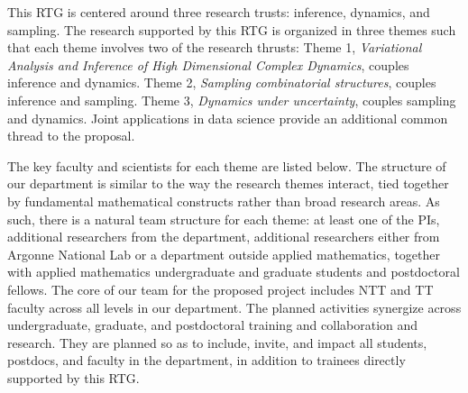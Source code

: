 \documentclass[11pt]{NSFamsart}
\begin{document}
This RTG is centered around three research trusts: inference, dynamics, and sampling. The research supported by this RTG is organized in three themes such that each theme involves two of the research thrusts: 
Theme 1, \emph{Variational Analysis and Inference of High Dimensional Complex Dynamics}, couples inference and dynamics. 
Theme 2, \emph{Sampling combinatorial structures}, couples inference and sampling. 
Theme 3, \emph{Dynamics under uncertainty}, couples sampling and dynamics. 
Joint applications in data science provide an additional common thread to the proposal. 

The key faculty and scientists for each theme are listed below. 
The structure of our department is similar to the way the research themes interact, tied together by fundamental mathematical constructs rather than broad research areas. As such, there is a natural team structure for each theme:  at least one of the PIs,  additional researchers from the department, additional researchers either from Argonne National Lab or a department outside applied mathematics, %
together with applied mathematics undergraduate and graduate students and postdoctoral fellows.
The core of our team for the proposed project includes NTT and TT faculty across all levels in our department. The planned activities synergize across undergraduate, graduate, and postdoctoral training and collaboration and research. They are planned so as to include, invite, and impact all students, postdocs, and faculty in the department, in addition to trainees directly supported by this RTG. 
\end{document}
